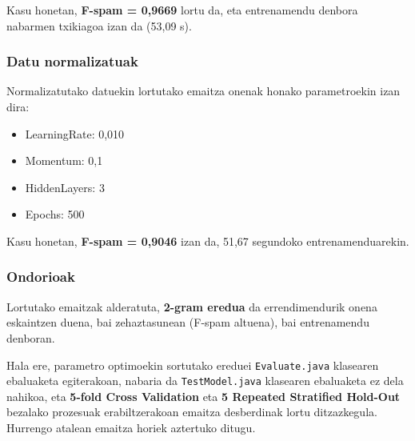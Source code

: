 \documentclass[12pt, a4paper]{article}
\begin{document}
Kasu honetan, \textbf{F-spam = 0,9669} lortu da, eta entrenamendu denbora nabarmen txikiagoa izan da (53,09 s).

\subsubsection*{Datu normalizatuak}
Normalizatutako datuekin lortutako emaitza onenak honako parametroekin izan dira:
\begin{itemize}
    \item LearningRate: 0,010
    \item Momentum: 0,1
    \item HiddenLayers: 3
    \item Epochs: 500
\end{itemize}

Kasu honetan, \textbf{F-spam = 0,9046} izan da, 51,67 segundoko entrenamenduarekin.


\begin{table}[h!]
\centering
\caption{Comparación de los mejores modelos de fine-tuning}
\end{table}

\subsubsection*{Ondorioak}
Lortutako emaitzak alderatuta, \textbf{2-gram eredua} da errendimendurik onena eskaintzen duena, bai zehaztasunean (F-spam altuena), bai entrenamendu denboran.

Hala ere, parametro optimoekin sortutako ereduei \texttt{Evaluate.java} klasearen ebaluaketa egiterakoan, nabaria da \texttt{TestModel.java} klasearen ebaluaketa ez dela nahikoa, eta \textbf{5-fold Cross Validation} eta \textbf{5 Repeated Stratified Hold-Out} bezalako prozesuak erabiltzerakoan emaitza desberdinak lortu ditzazkegula. Hurrengo atalean emaitza horiek aztertuko ditugu.
\end{document}
